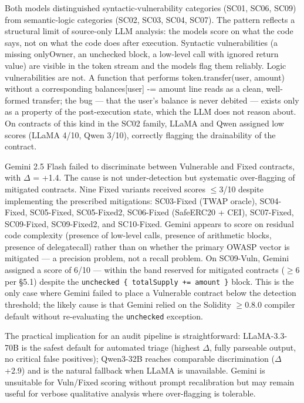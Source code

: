 Both models distinguished syntactic-vulnerability categories (SC01, SC06, SC09) from semantic-logic categories (SC02, SC03, SC04, SC07). The pattern reflects a structural limit of source-only LLM analysis: the models score on what the code says, not on what the code does after execution. Syntactic vulnerabilities (a missing onlyOwner, an unchecked block, a low-level call with ignored return value) are visible in the token stream and the models flag them reliably. Logic vulnerabilities are not. A function that performs token.transfer(user, amount) without a corresponding balances[user] -= amount line reads as a clean, well-formed transfer; the bug — that the user's balance is never debited — exists only as a property of the post-execution state, which the LLM does not reason about. On contracts of this kind in the SC02 family, LLaMA and Qwen assigned low scores (LLaMA 4/10, Qwen 3/10), correctly flagging the drainability of the contract.

Gemini 2.5 Flash failed to discriminate between Vulnerable and Fixed contracts, with $\Delta$ = +1.4. The cause is not under-detection but systematic over-flagging of mitigated contracts. Nine Fixed variants received scores $\leq$3/10 despite implementing the prescribed mitigations: SC03-Fixed (TWAP oracle), SC04-Fixed, SC05-Fixed, SC05-Fixed2, SC06-Fixed (SafeERC20 + CEI), SC07-Fixed, SC09-Fixed, SC09-Fixed2, and SC10-Fixed. Gemini appears to score on residual code complexity (presence of low-level calls, presence of arithmetic blocks, presence of delegatecall) rather than on whether the primary OWASP vector is mitigated — a precision problem, not a recall problem. On SC09-Vuln, Gemini assigned a score of 6/10 — within the band reserved for mitigated contracts ($\geq$6 per §5.1) despite the \texttt{unchecked \{ totalSupply += amount \}} block. This is the only case where Gemini failed to place a Vulnerable contract below the detection threshold; the likely cause is that Gemini relied on the Solidity $\geq$0.8.0 compiler default without re-evaluating the \texttt{unchecked} exception.

The practical implication for an audit pipeline is straightforward: LLaMA-3.3-70B is the safest default for automated triage (highest $\Delta$, fully parseable output, no critical false positives); Qwen3-32B reaches comparable discrimination ($\Delta$ +2.9) and is the natural fallback when LLaMA is unavailable. Gemini is unsuitable for Vuln/Fixed scoring without prompt recalibration but may remain useful for verbose qualitative analysis where over-flagging is tolerable.


